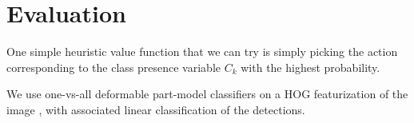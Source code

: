 \section{Evaluation} \label{sec:evaluation}


One simple heuristic value function that we can try is simply picking the action corresponding to the class presence variable $C_k$ with the highest probability.

We use one-vs-all deformable part-model classifiers on a HOG featurization of the image \cite{Felzenszwalb2010a}, with associated linear classification of the detections.

\begin{figure}[h!]
\centering
{} \hfill
{}
\end{figure}
